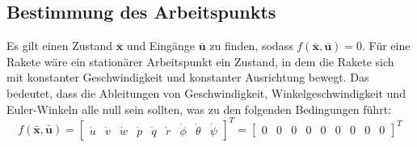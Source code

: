 \subsection{Bestimmung des Arbeitspunkts}
\label{subsec:trimming}
Es gilt einen Zustand $\bar{\mathbf{x}}$ und Eingänge $\bar{\mathbf{u}}$ zu finden, sodass $f(\bar{\mathbf{x}}, \bar{\mathbf{u}}) = 0$. Für eine Rakete wäre ein stationärer Arbeitspunkt ein Zustand, in dem die Rakete sich mit konstanter Geschwindigkeit und konstanter Ausrichtung bewegt. Das bedeutet, dass die Ableitungen von Geschwindigkeit, Winkelgeschwindigkeit und Euler-Winkeln alle null sein sollten, was zu den folgenden Bedingungen führt:
\begin{equation}
f(\bar{\mathbf{x}}, \bar{\mathbf{u}}) =
\begin{bmatrix}\dot{u} &
\dot{v} &
\dot{w} &
\dot{p} &
\dot{q} &
\dot{r} &
\dot{\phi} &
\dot{\theta} &
\dot{\psi}
\end{bmatrix}^T=
\begin{bmatrix}0 &
0 &
0 &
0 &
0 &
0 &
0 &
0 &
0
\end{bmatrix}^T
\end{equation}
\\

